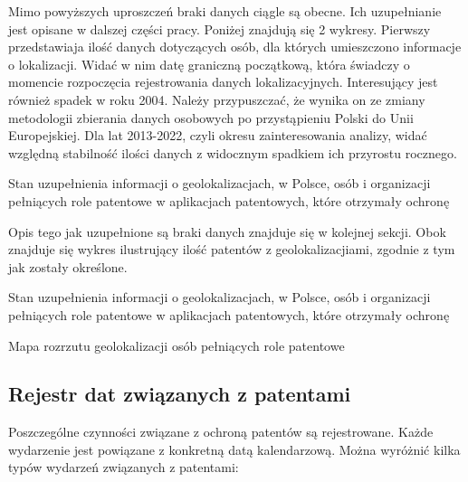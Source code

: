 \begin{multicols}{2}
Mimo powyższych uproszczeń braki danych ciągle są obecne. Ich uzupełnianie
jest opisane w dalszej części pracy. Poniżej znajdują się 2 wykresy. 
Pierwszy przedstawiaja ilość danych dotyczących osób, dla których 
umieszczono informacje o lokalizacji. Widać w nim datę graniczną początkową,
która świadczy o momencie rozpoczęcia rejestrowania danych lokalizacyjnych.
Interesujący jest również spadek w roku 2004. Należy przypuszczać, że wynika
on ze zmiany metodologii zbierania danych osobowych po przystąpieniu
Polski do Unii Europejskiej.
Dla lat 2013-2022, czyli okresu zainteresowania analizy,
widać względną stabilność ilości danych z widocznym
spadkiem ich przyrostu rocznego. 

\columnbreak
{}
{ Stan uzupełnienia informacji
  o geolokalizacjach,
  w Polsce,
  osób i organizacji 
  pełniących role patentowe 
  w aplikacjach patentowych, które otrzymały ochronę}

\end{multicols}


\newpage
\begin{multicols}{2}

Opis tego jak uzupełnione są braki danych znajduje się w kolejnej sekcji.
Obok znajduje się wykres ilustrujący ilość patentów z geolokalizacjiami,
zgodnie z tym jak zostały określone.

{ Stan uzupełnienia informacji o geolokalizacjach, w Polsce, 
  osób i organizacji  pełniących role patentowe
  w aplikacjach patentowych, które otrzymały ochronę}

{Mapa rozrzutu geolokalizacji osób pełniących role patentowe}

\end{multicols}




\subsection{Rejestr dat związanych z patentami}

Poszczególne czynności związane z ochroną patentów są rejestrowane.
Każde wydarzenie jest powiązane z konkretną datą kalendarzową.
Można wyróżnić kilka typów wydarzeń związanych z patentami:

